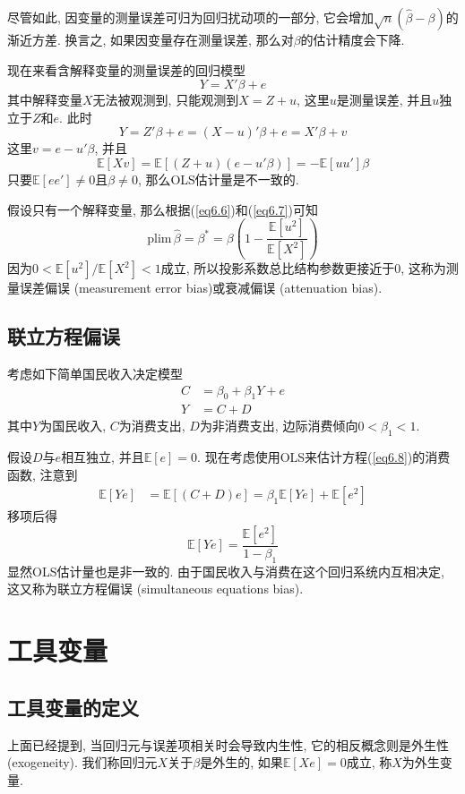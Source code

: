 \documentclass[cn, 12pt, math=mtpro2, bibstyle=apa, blue, twocol]{elegantbook}
\newcommand{\E}{\mathbb{E}}
\newcommand{\hb}{\hat{\beta}}
\begin{document}
尽管如此, 因变量的测量误差可归为回归扰动项的一部分, 它会增加$\sqrt{n}(\hb-\beta)$的渐近方差. 换言之, 如果因变量存在测量误差, 那么对$\beta$的估计精度会下降.

现在来看含解释变量的测量误差的回归模型
\begin{equation*}\label{eq6.5}
  Y=X'\beta+e
\end{equation*}
其中解释变量$X$无法被观测到, 只能观测到$X=Z+u$, 这里$u$是测量误差, 并且$u$独立于$Z$和$e$. 此时
\begin{equation}\label{eq6.7}
  Y=Z'\beta+e=(X-u)'\beta+e=X'\beta+v
\end{equation}
这里$v=e-u'\beta$, 并且
$$\E[Xv]=\E[(Z+u)(e-u'\beta)]=-\E[uu']\beta$$
只要$\E[ee']\neq0$且$\beta\neq0$, 那么OLS估计量是不一致的.

假设只有一个解释变量, 那么根据(\ref{eq6.6})和(\ref{eq6.7})可知
$$\text{plim}\,\hb=\beta^\ast=\beta\left(1-\frac{\E[u^2]}{\E[X^2]}\right)$$
因为$0<\E[u^2]/\E[X^2]<1$成立, 所以投影系数总比结构参数更接近于0, 这称为测量误差偏误 (measurement error bias)或衰减偏误 (attenuation bias).
\subsection{联立方程偏误}
考虑如下简单国民收入决定模型
\begin{align}
C&=\beta_0+\beta_1Y+e \label{eq6.8} \\
Y&=C+D \nonumber
\end{align}
其中$Y$为国民收入, $C$为消费支出, $D$为非消费支出, 边际消费倾向$0<\beta_1<1$.

假设$D$与$e$相互独立, 并且$\E[e]=0$. 现在考虑使用OLS来估计方程(\ref{eq6.8})的消费函数, 注意到
\begin{align*}
\E[Ye]&=\E[(C+D)e]=\beta_1\E[Ye]+\E[e^2]
\end{align*}
移项后得
$$\E[Ye]=\frac{\E[e^2]}{1-\beta_1}$$
显然OLS估计量也是非一致的. 由于国民收入与消费在这个回归系统内互相决定, 这又称为联立方程偏误 (simultaneous equations bias).

\section{工具变量}
\subsection{工具变量的定义}
上面已经提到, 当回归元与误差项相关时会导致内生性, 它的相反概念则是外生性 (exogeneity). 我们称回归元$X$关于$\beta$是外生的, 如果$\E[Xe]=0$成立, 称$X$为外生变量.
\end{document}
